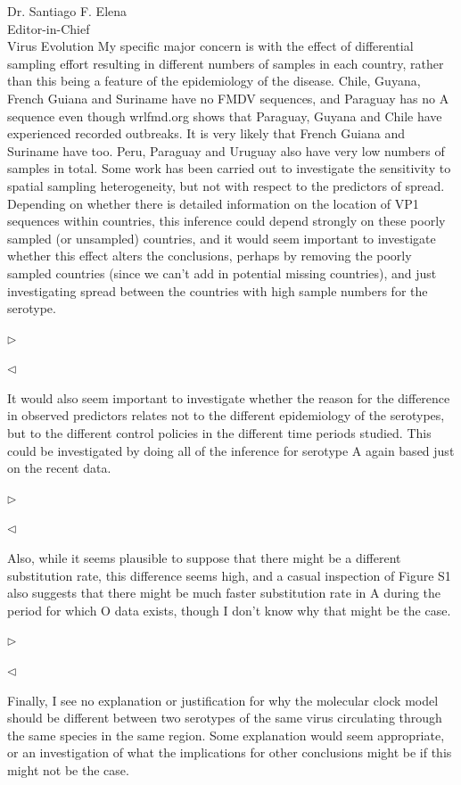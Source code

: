 \documentclass[ucla,biomath,12pt,noaddrfooter,datefrom]{UC_letter}
\newenvironment{reply}{$\triangleright$\bf}{$\triangleleft$}
\begin{document}
\begin{letter}{
Dr. Santiago F. Elena \\
Editor-in-Chief \\
Virus Evolution
}
My specific major concern is with the effect of differential sampling effort resulting in different numbers of samples in each country, rather than this being a feature of the epidemiology of the disease. 
Chile, Guyana, French Guiana and Suriname have no FMDV sequences, and Paraguay has no A sequence even though wrlfmd.org shows that Paraguay, Guyana and Chile have experienced recorded outbreaks. 
It is very likely that French Guiana and Suriname have too. 
Peru, Paraguay and Uruguay also have very low numbers of samples in total. Some work has been carried out to investigate the sensitivity to spatial sampling heterogeneity, but not with respect to the predictors of spread. 
Depending on whether there is detailed information on the location of VP1 sequences within countries, this inference could depend strongly on these poorly sampled (or unsampled) countries, and it would seem important to investigate whether this effect alters the conclusions, perhaps by removing the poorly sampled countries (since we can't add in potential missing countries), and just investigating spread between the countries with high sample numbers for the serotype.

\begin{reply}

\end{reply}

It would also seem important to investigate whether the reason for the difference in observed predictors relates not to the different epidemiology of the serotypes, but to the different control policies in the different time periods studied. 
This could be investigated by doing all of the inference for serotype A again based just on the recent data.

\begin{reply}

\end{reply}

Also, while it seems plausible to suppose that there might be a different substitution rate, this difference seems high, and a casual inspection of Figure S1 also suggests that there might be much faster substitution rate in A during the period for which O data exists, though I don't know why that might be the case.

\begin{reply}

\end{reply}

Finally, I see no explanation or justification for why the molecular clock model should be different between two serotypes of the same virus circulating through the same species in the same region. 
Some explanation would seem appropriate, or an investigation of what the implications for other conclusions might be if this might not be the case.


\end{letter}
\end{document}
